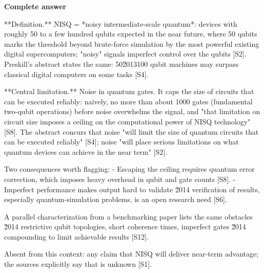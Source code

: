 \documentclass[10pt]{article}
\begin{document}
\textbf{Complete answer}
\begin{AnswerText}
**Definition.** NISQ = *noisy intermediate-scale quantum*: devices with roughly 50 to a few hundred qubits expected in the near future, where 50 qubits marks the threshold beyond brute-force simulation by the most powerful existing digital supercomputers; "noisy" signals imperfect control over the qubits [S2]. Preskill's abstract states the same: 50\u2013100 qubit machines may surpass classical digital computers on some tasks [S4].

**Central limitation.** Noise in quantum gates. It caps the size of circuits that can be executed reliably: naively, no more than about 1000 gates (fundamental two-qubit operations) before noise overwhelms the signal, and "that limitation on circuit size imposes a ceiling on the computational power of NISQ technology" [S8]. The abstract concurs that noise "will limit the size of quantum circuits that can be executed reliably" [S4]; noise "will place serious limitations on what quantum devices can achieve in the near term" [S2].

Two consequences worth flagging:
- Escaping the ceiling requires quantum error correction, which imposes heavy overhead in qubit and gate counts [S8].
- Imperfect performance makes output hard to validate \u2014 verification of results, especially quantum-simulation problems, is an open research need [S6].

A parallel characterization from a benchmarking paper lists the same obstacles \u2014 restrictive qubit topologies, short coherence times, imperfect gates \u2014 compounding to limit achievable results [S12].

Absent from this context: any claim that NISQ will deliver near-term advantage; the sources explicitly say that is unknown [S1].
\end{AnswerText}
\end{document}
